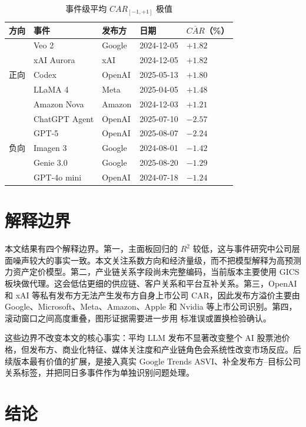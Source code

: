 \documentclass[11pt,fontset=fandol]{ctexart}
\begin{document}
\begin{table}[htbp]
\centering
\caption{事件级平均 $CAR_{[-1,+1]}$ 极值}
\label{tab:extreme}
\small
\begin{tabular}{llll>{\centering\arraybackslash}p{2.2cm}}
\toprule
方向 & 事件 & 发布方 & 日期 & $\overline{CAR}$（\%） \\
\midrule
\multirow{5}{*}{正向}
  & Veo 2       & Google & 2024-12-05 & $+1.82$ \\
  & xAI Aurora  & xAI    & 2024-12-05 & $+1.82$ \\
  & Codex       & OpenAI & 2025-05-13 & $+1.80$ \\
  & LLaMA 4     & Meta   & 2025-04-05 & $+1.48$ \\
  & Amazon Nova & Amazon & 2024-12-03 & $+1.21$ \\
\midrule
\multirow{5}{*}{负向}
  & ChatGPT Agent & OpenAI & 2025-07-10 & $-2.57$ \\
  & GPT-5         & OpenAI & 2025-08-07 & $-2.24$ \\
  & Imagen 3      & Google & 2024-08-01 & $-1.42$ \\
  & Genie 3.0     & Google & 2025-08-20 & $-1.29$ \\
  & GPT-4o mini   & OpenAI & 2024-07-18 & $-1.24$ \\
\bottomrule
\end{tabular}
\end{table}

\section{解释边界}
\label{sec:limits}

本文结果有四个解释边界。第一，主面板回归的 $R^2$ 较低，这与事件研究中公司层面噪声较大的事实一致。本文关注系数方向和经济量级，而不把模型解释为高预测力资产定价模型。第二，产业链关系字段尚未完整编码，当前版本主要使用 GICS 板块做代理。这会低估更细的供应链、客户关系和平台互补关系。第三，OpenAI 和 xAI 等私有发布方无法产生发布方自身上市公司 CAR，因此发布方溢价主要由 Google、Microsoft、Meta、Amazon、Apple 和 Nvidia 等上市公司识别。第四，滚动窗口之间高度重叠，图形证据需要进一步用 \citet{NeweyWest1987} 标准误或置换检验确认。

这些边界不改变本文的核心事实：平均 LLM 发布不显著改变整个 AI 股票池价格，但发布方、商业化特征、媒体关注度和产业链角色会系统性改变市场反应。后续版本最有价值的扩展，是接入真实 Google Trends ASVI、补全发布方--目标公司关系标签，并把同日多事件作为单独识别问题处理。

\section{结论}
\end{document}
